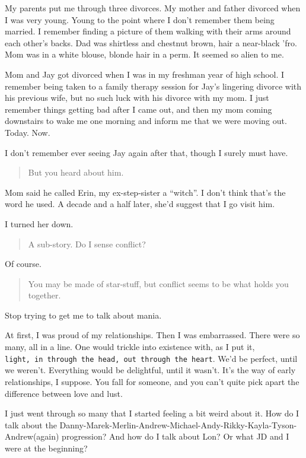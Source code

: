 My parents put me through three divorces. My mother and father divorced when I was very young. Young to the point where I don't remember them being married. I remember finding a picture of them walking with their arms around each other's backs. Dad was shirtless and chestnut brown, hair a near-black 'fro. Mom was in a white blouse, blonde hair in a perm. It seemed so alien to me.

Mom and Jay got divorced when I was in my freshman year of high school. I remember being taken to a family therapy session for Jay's lingering divorce with his previous wife, but no such luck with his divorce with my mom. I just remember things getting bad after I came out, and then my mom coming downstairs to wake me one morning and inform me that we were moving out. Today. Now.

I don't remember ever seeing Jay again after that, though I surely must have.

\begin{quote}
But you heard about him.
\end{quote}

Mom said he called Erin, my ex-step-sister a ``witch''. I don't think that's the word he used. A decade and a half later, she'd suggest that I go visit him.

I turned her down.

\begin{quote}
A sub-story. Do I sense conflict?
\end{quote}

Of course.

\begin{quote}
You may be made of star-stuff, but conflict seems to be what holds you together.
\end{quote}

Stop trying to get me to talk about mania.

At first, I was proud of my relationships. Then I was embarrassed. There were so many, all in a line. One would trickle into existence with, as I put it, \texttt{light,\ in\ through\ the\ head,\ out\ through\ the\ heart}. We'd be perfect, until we weren't. Everything would be delightful, until it wasn't. It's the way of early relationships, I suppose. You fall for someone, and you can't quite pick apart the difference between love and lust.

I just went through so many that I started feeling a bit weird about it. How do I talk about the Danny-Marek-Merlin-Andrew-Michael-Andy-Rikky-Kayla-Tyson-Andrew(again) progression? And how do I talk about Lon? Or what JD and I were at the beginning?

